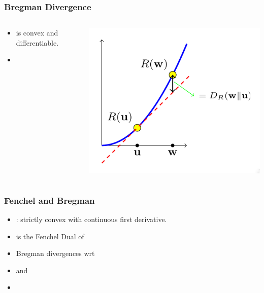 \documentclass[handout]{beamer}
\begin{document}
 \begin{frame}
    \frametitle{Bregman Divergence}
   \begin{columns}
     \begin{column}{0.55\textwidth}
       \begin{itemize}
       \item {} is convex and differentiable.
       \item {}
       \end{itemize}
     \end{column}
      \begin{column}{0.43\textwidth}
        \includegraphics[width=\textwidth]{figures/BregmanDivergence.png}
      \end{column}
    \end{columns}
  \end{frame}
 
\begin{frame}
  \frametitle{Fenchel and Bregman}
  \begin{itemize}
  \item
    : strictly convex with continuous first derivative.
  \item {} is the Fenchel Dual of 
  \item {} Bregman divergences wrt 
  \item {} and 
  \item {}
  \end{itemize}
\end{frame}
\end{document}
